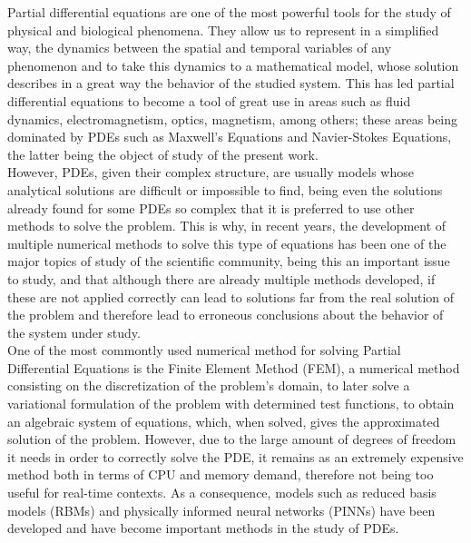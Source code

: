 \documentclass[12pt,letterpaper]{article}
\begin{document}
Partial differential equations are one of the most powerful tools for the study of physical 
and biological phenomena. They allow us to represent in a simplified way, the dynamics 
between the spatial and temporal variables of any phenomenon and to take this dynamics to a 
mathematical model, whose solution describes in a great way the behavior of the studied 
system\cite{logan2014applied}. This has led partial differential equations to become 
a tool of great use in areas such as fluid dynamics, electromagnetism, optics, magnetism, 
among others\cite{farlow1993partial}; these areas being dominated by PDEs such as Maxwell's 
Equations and Navier-Stokes Equations, the latter being the object of study of the present 
work. \\

However, PDEs, given their complex structure, are usually models whose analytical solutions 
are difficult or impossible to find, being even the solutions already found for some PDEs 
so complex that it is preferred to use other methods to solve the problem\cite{strauss2007partial}. This is why, in 
recent years, the development of multiple numerical methods to solve this type of equations 
has been one of the major topics of study of the scientific community, being this an 
important issue to study, and that although there are already multiple methods developed, 
if these are not applied correctly can lead to solutions far from the real solution of the 
problem and therefore lead to erroneous conclusions about the behavior of the system under 
study.\\

One of the most commontly used numerical method for solving Partial Differential Equations
is the Finite Element Method (FEM), a numerical method consisting on the discretization of
the problem's domain, to later solve a variational formulation of the problem with 
determined test functions, to obtain an algebraic system of equations, which, when solved, 
gives the approximated solution of the problem. However, due to the large amount of degrees 
of freedom it needs in order to correctly solve the PDE, it remains as an extremely 
expensive method both in terms of CPU and memory demand, therefore not being too useful for 
real-time contexts\cite{hesthaven2018non}\cite{PINNQuarteroni}. As a consequence, models 
such as reduced basis models (RBMs) and physically informed neural networks (PINNs) have 
been developed and have become important methods in the study of PDEs.\\
\end{document}
